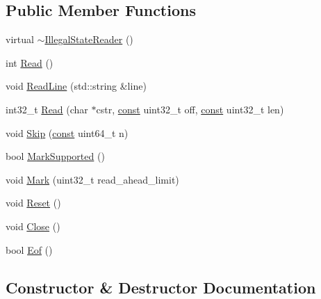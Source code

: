 \subsection*{Public Member Functions}
\begin{DoxyCompactItemize}
\item 
virtual \mbox{\hyperlink{classlucene_1_1core_1_1analysis_1_1IllegalStateReader_a9965d5df8761b75e9e5a1dadb5973dbd}{$\sim$\+Illegal\+State\+Reader}} ()
\item 
int \mbox{\hyperlink{classlucene_1_1core_1_1analysis_1_1IllegalStateReader_a9bca98f676ac3d0eeadfd4a2cc78d764}{Read}} ()
\item 
void \mbox{\hyperlink{classlucene_1_1core_1_1analysis_1_1IllegalStateReader_a39217e818ee6678830260a10885400f8}{Read\+Line}} (std\+::string \&line)
\item 
int32\+\_\+t \mbox{\hyperlink{classlucene_1_1core_1_1analysis_1_1IllegalStateReader_a8017ca4fc795b71e16bb87d4a24bdfa9}{Read}} (char $\ast$cstr, \mbox{\hyperlink{ZlibCrc32_8h_a2c212835823e3c54a8ab6d95c652660e}{const}} uint32\+\_\+t off, \mbox{\hyperlink{ZlibCrc32_8h_a2c212835823e3c54a8ab6d95c652660e}{const}} uint32\+\_\+t len)
\item 
void \mbox{\hyperlink{classlucene_1_1core_1_1analysis_1_1IllegalStateReader_aa2a34d98ca51e81297960b13aa0fa18e}{Skip}} (\mbox{\hyperlink{ZlibCrc32_8h_a2c212835823e3c54a8ab6d95c652660e}{const}} uint64\+\_\+t n)
\item 
bool \mbox{\hyperlink{classlucene_1_1core_1_1analysis_1_1IllegalStateReader_ae2de5e9375664ca55c80b224ac3cd998}{Mark\+Supported}} ()
\item 
void \mbox{\hyperlink{classlucene_1_1core_1_1analysis_1_1IllegalStateReader_a96a8cb65743ac1a4db9633b2e0d203fb}{Mark}} (uint32\+\_\+t read\+\_\+ahead\+\_\+limit)
\item 
void \mbox{\hyperlink{classlucene_1_1core_1_1analysis_1_1IllegalStateReader_a7c457898d46f0dcf7de18a1730330c02}{Reset}} ()
\item 
void \mbox{\hyperlink{classlucene_1_1core_1_1analysis_1_1IllegalStateReader_aa92b3c9c3da611e2e44c3edf4078dbe6}{Close}} ()
\item 
bool \mbox{\hyperlink{classlucene_1_1core_1_1analysis_1_1IllegalStateReader_a0f3665a702d4b01dc3298e547379339a}{Eof}} ()
\end{DoxyCompactItemize}


\subsection{Constructor \& Destructor Documentation}
\mbox{\label{classlucene_1_1core_1_1analysis_1_1IllegalStateReader_a9965d5df8761b75e9e5a1dadb5973dbd}} 
